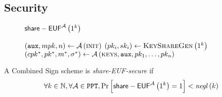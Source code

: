   \subsection{Security}
    \begin{figure}[!htbp]
      \begin{gamebox}{$\mathsf{share-EUF}^{\mathcal{A}}\left(1^k\right)$}
        \begin{algorithmic}[1]
          \State $\left(\mathtt{aux}, mpk, n\right) \gets
          \mathcal{A}\left(\textsc{init}\right)$
            \State $\left(pk_i, sk_i\right) \gets
            \textsc{KeyShareGen}\left(1^k\right)$
          \EndFor
          \State $\left(cpk^*, pk^*, m^*, \sigma^*\right) \gets
          \mathcal{A}\left(\textsc{keys}, \mathtt{aux}, pk_1, \dots, pk_n\right)$
            \State {}
          \Else
            \State {}
          \EndIf
        \end{algorithmic}
      \end{gamebox}
      \caption{}
      \label{game:comb:share}
    \end{figure}
    \begin{definition}
      A Combined Sign scheme is \emph{\textsf{share-EUF}-secure} if
      \begin{equation*}
        \forall k \in \mathbb{N}, \forall \mathcal{A} \in \mathtt{PPT},
        \Pr\left[\mathsf{share-EUF}^{\mathcal{A}}\left(1^k\right) = 1\right] <
        \mathit{negl}\left(k\right)
      \end{equation*}
    \end{definition}

